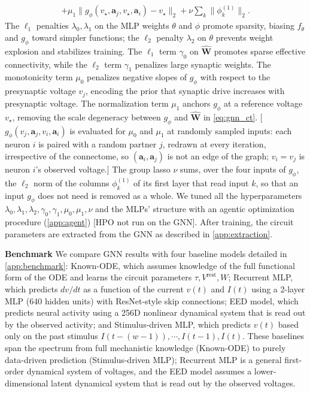 \documentclass{article}
\def\stimbase{Stimulus-driven MLP}
\def\eedbase{EED model}
\def\mlpbase{Recurrent MLP}
\def\vrest{V^{\mathrm{rest}}}
\begin{document}
{\begin{equation}
\begin{aligned}
+ \mu_1\|g_\phi(v_\star,\mathbf{a}_j,v_\star,\mathbf{a}_i)-v_\star\|_2
+ \nu \textstyle\sum_{k} \|\phi^{(1)}_{k}\|_2 .
\end{aligned}
\label{eq:loss_full}
\end{equation}
The $\ell_1$ penalties $\lambda_0,\lambda_1$ on the MLP weights $\theta$ and $\phi$ promote sparsity, biasing $f_\theta$ and $g_\phi$ toward simpler functions; {\color{revised}the $\ell_2$ penalty $\lambda_2$ on $\theta$ prevents weight explosion and stabilizes training.} The $\ell_1$ term $\gamma_0$ on $\hat{\mathbf{W}}$ promotes sparse effective connectivity, while the $\ell_2$ term $\gamma_1$ penalizes large synaptic weights. The monotonicity term {\color{revised}$\mu_0$} penalizes negative slopes of $g_\phi$ with respect to {\color{revised}the presynaptic voltage $v_j$}, encoding the prior that synaptic drive increases with presynaptic voltage. The normalization term {\color{revised}$\mu_1$} anchors $g_\phi$ at a reference voltage $v_\star$, removing the scale degeneracy between $g_\phi$ and $\hat{\mathbf{W}}$ in \cref{eq:gnn_ct}. {\color{revised}[$g_\phi(v_j,\mathbf{a}_j,v_i,\mathbf{a}_i)$ is evaluated for $\mu_0$ and $\mu_1$ at randomly sampled inputs: each neuron $i$ is paired with a random partner $j$, redrawn at every iteration, irrespective of the connectome, so $(\mathbf{a}_i,\mathbf{a}_j)$ is not an edge of the graph; $v_i = v_j$ is neuron $i$'s observed voltage.]} {\color{revised}The group lasso $\nu$ sums, over the four inputs of $g_\phi$, the $\ell_2$ norm of the columns $\phi^{(1)}_{k}$ of its first layer that read input $k$, so that an input $g_\phi$ does not need is removed as a whole.} We tuned all the hyperparameters {\color{revised}$\lambda_0,\lambda_1,\lambda_2,\gamma_0,\gamma_1,\mu_0,\mu_1,\nu$} and the MLPs' structure with an agentic optimization procedure (\cref{app:agent}) {\color{revised}[HPO not run on the GNN]}. After training, the circuit parameters are extracted from the GNN as described in \cref{app:extraction}.
}%

\textbf{Benchmark}
We compare GNN results with four baseline models detailed in \cref{app:benchmark}: Known-ODE, which assumes knowledge of the full functional form of the ODE and learns the circuit parameters $\tau, \vrest, W$; \mlpbase, which predicts $dv/dt$ as a function of the current $v(t)$ and $I(t)$ using a 2-layer MLP (640 hidden units) with ResNet-style skip connections; \eedbase, which predicts neural activity using a 256D nonlinear dynamical system that is read out by the observed activity; and Stimulus-driven MLP, which predicts $v(t)$ based only on the past stimulus $I(t-(w-1)), \cdots, I(t-1), I(t)$. These baselines span the spectrum from full mechanistic knowledge (Known-ODE) to purely data-driven prediction (\stimbase); \mlpbase{} is a general first-order dynamical system of voltages, and the \eedbase{} assumes a lower-dimensional latent dynamical system that is read out by the observed voltages.
\end{document}
